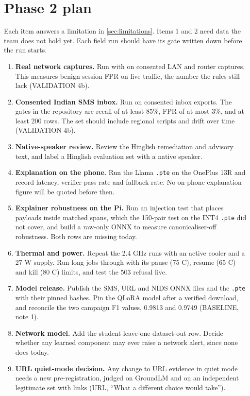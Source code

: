 \section{Phase 2 plan}\label{sec:future}

Each item answers a limitation in \cref{sec:limitations}. Items 1 and 2 need data the team does not hold yet. Each field run should have its gate written down before the run starts.

\begin{enumerate}
\item \textbf{Real network captures.} Run  with  on consented LAN and router captures. This measures benign-session FPR on live traffic, the number the rules still lack (VALIDATION 4b).
\item \textbf{Consented Indian SMS inbox.} Run  on consented inbox exports. The gates in the repository are recall of at least 85\%, FPR of at most 3\%, and at least 200 rows. The set should include regional scripts and drift over time (VALIDATION 4b).
\item \textbf{Native-speaker review.} Review the Hinglish remediation and advisory text, and label a Hinglish evaluation set with a native speaker.
\item \textbf{Explanation on the phone.} Run the Llama \texttt{.pte} on the OnePlus 13R and record latency, verifier pass rate and fallback rate. No on-phone explanation figure will be quoted before then.
\item \textbf{Explainer robustness on the Pi.} Run an injection test that places payloads inside matched spans, which the 150-pair test on the INT4 \texttt{.pte} did not cover, and build a raw-only ONNX to measure canonicaliser-off robustness. Both rows are missing today.
\item \textbf{Thermal and power.} Repeat the 2.4 GHz runs with an active cooler and a 27 W supply. Run long jobs through  with its pause (75 \textdegree C), resume (65 \textdegree C) and kill (80 \textdegree C) limits, and test the 503 refusal live.
\item \textbf{Model release.} Publish the SMS, URL and NIDS ONNX files and the \texttt{.pte} with their pinned hashes. Pin the QLoRA model after a verified download, and reconcile the two campaign F1 values, 0.9813 and 0.9749 (BASELINE, note 1).
\item \textbf{Network model.} Add the student leave-one-dataset-out row. Decide whether any learned component may ever raise a network alert, since none does today.
\item \textbf{URL quiet-mode decision.} Any change to URL evidence in quiet mode needs a new pre-registration, judged on GroundLM and on an independent legitimate set with links (URL, ``What a different choice would take'').
\end{enumerate}
